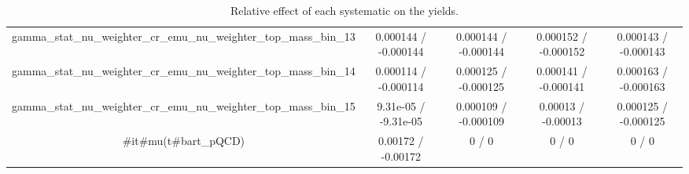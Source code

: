 \documentclass[10pt]{article}
\begin{document}
\begin{table}[htbp]
\begin{center}
\begin{tabular}{|c|c|c|c|c|}
  gamma_stat_nu_weighter_cr_emu_nu_weighter_top_mass_bin_13 & 0.000144 / -0.000144 & 0.000144 / -0.000144 & 0.000152 / -0.000152 & 0.000143 / -0.000143 \\ 
  gamma_stat_nu_weighter_cr_emu_nu_weighter_top_mass_bin_14 & 0.000114 / -0.000114 & 0.000125 / -0.000125 & 0.000141 / -0.000141 & 0.000163 / -0.000163 \\ 
  gamma_stat_nu_weighter_cr_emu_nu_weighter_top_mass_bin_15 & 9.31e-05 / -9.31e-05 & 0.000109 / -0.000109 & 0.00013 / -0.00013 & 0.000125 / -0.000125 \\ 
  #it{#mu}(t#bar{t}_{pQCD}) & 0.00172 / -0.00172 & 0 / 0 & 0 / 0 & 0 / 0 \\ 
\hline 
\end{tabular} 
\caption{Relative effect of each systematic on the yields.} 
\end{center} 
\end{table} 
\end{document}
